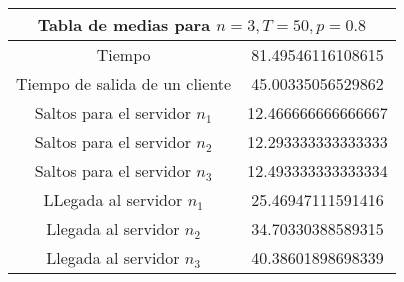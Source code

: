 \documentclass{article}
\begin{document}
\begin{table}[h]
\centering
\begin{tabular}{|c|c|}
\hline
\multicolumn{2}{|c|}{\textbf{Tabla de medias para $n=3,T=50,p=0.8$}} \\
\hline
Tiempo & 81.49546116108615\\
\hline
Tiempo de salida de un cliente & 45.00335056529862\\
\hline
Saltos para el servidor $n_1$ & 12.466666666666667\\
\hline
Saltos para el servidor $n_2$ & 12.293333333333333\\
\hline
Saltos para el servidor $n_3$ & 12.493333333333334\\
\hline
LLegada al servidor $n_1$ & 25.46947111591416\\
\hline
Llegada al servidor $n_2$ & 34.70330388589315\\
\hline
Llegada al servidor $n_3$ & 40.38601898698339\\
\hline
\end{tabular}
\caption{}
\end{table}
\end{document}
